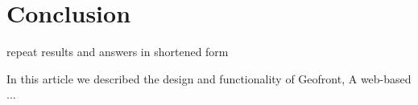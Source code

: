 \chapter{Conclusion}

repeat results and answers in shortened form


In this article we described the design and functionality of Geofront, A web-based ...












